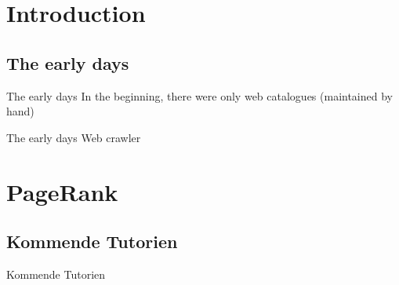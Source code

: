 \documentclass[usepdftitle=false,hyperref={pdfpagelabels=false}]{beamer}
\begin{document}
\title{\titleText}
\subtitle{History, Algorithm}
\author{\tutor}
\date{\today}
\subject{Programmieren}

\frame{\titlepage}



\section{Introduction}
\subsection{The early days}
\begin{frame}{The early days}
    In the beginning, there were only web catalogues (maintained by hand)
\end{frame}

\begin{frame}{The early days}
    Web crawler
\end{frame}

\section{PageRank}
\subsection{Kommende Tutorien}
\begin{frame}{Kommende Tutorien}

\end{frame}

\end{document}

